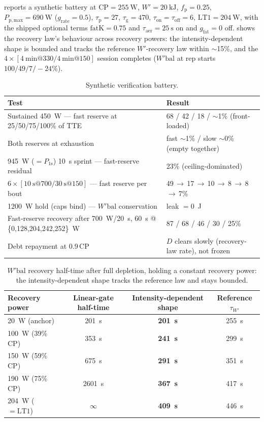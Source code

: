 \documentclass[11pt,a4paper]{article}
\newcommand{\Wp}{\ensuremath{W'}}
\newcommand{\Wbal}{\ensuremath{W'\!\text{bal}}}
\newcommand{\CP}{\ensuremath{\mathrm{CP}}}
\newcommand{\LTone}{\ensuremath{\mathrm{LT1}}}
\newcommand{\fp}{\ensuremath{f_{\mathrm p}}}
\newcommand{\Ppmax}{\ensuremath{P_{\mathrm{p,max}}}}
\newcommand{\grate}{\ensuremath{g_{\mathrm{rate}}}}
\newcommand{\taup}{\ensuremath{\tau_{\mathrm p}}}
\newcommand{\taug}{\ensuremath{\tau_{\mathrm g}}}
\newcommand{\tauon}{\ensuremath{\tau_{\mathrm{on}}}}
\newcommand{\tauoff}{\ensuremath{\tau_{\mathrm{off}}}}
\newcommand{\tauW}{\ensuremath{\tau_{W'}}}
\newcommand{\tauaer}{\ensuremath{\tau_{\mathrm{aer}}}}
\newcommand{\Pos}{\ensuremath{P_{1\mathrm s}}}
\begin{document}
 reports a synthetic battery at $\CP = 255~\mathrm{W}$, $\Wp = 20~\mathrm{kJ}$,
$\fp = 0.25$, $\Ppmax = 690~\mathrm{W}$ ($\grate = 0.5$), $\taup = 27$, $\taug = 470$,
$\tauon = \tauoff = 6$, $\LTone = 204~\mathrm{W}$, with the shipped optional terms $\mathrm{fatK} = 0.75$
and $\tauaer = 25~\mathrm{s}$ on and $g_{\mathrm{fat}} = 0$ off.  shows the recovery law's behaviour
across recovery powers: the intensity-dependent shape is bounded and tracks the reference \Wp-recovery law
within $\sim$15\%, and the $4\times[\SI{4}{\minute}@330 / \SI{4}{\minute}@150]$ session completes
(\Wbal{} at rep starts $100/49/7/-24$\%).

\begin{table}[htbp]\centering\small
\caption{Synthetic verification battery.}
\label{tab:battery}
\renewcommand{\arraystretch}{1.2}
\begin{tabularx}{\linewidth}{@{}Xl@{}}
\toprule
\textbf{Test} & \textbf{Result} \\
\midrule
Sustained 450~W --- fast reserve at 25/50/75/100\% of TTE & 68 / 42 / 18 / $\sim$1\% (front-loaded) \\
Both reserves at exhaustion & fast $\sim$1\% / slow $\sim$0\% (empty together) \\
945~W ($=\Pos$) 10~s sprint --- fast-reserve residual & 23\% (ceiling-dominated) \\
$6\times[\SI{10}{\second}@700 / \SI{30}{\second}@150]$ --- fast reserve per bout & 49\,$\to$\,17\,$\to$\,10\,$\to$\,8\,$\to$\,8\,$\to$\,7\% \\
1200~W hold (caps bind) --- \Wbal{} conservation & leak $= 0$~J \\
Fast-reserve recovery after 700~W/20~s, 60~s @ \{0,128,204,242,252\}~W & 87 / 68 / 46 / 30 / 25\% \\
Debt repayment at 0.9\,\CP & $D$ clears slowly (recovery-law rate), not frozen \\
\bottomrule
\end{tabularx}
\end{table}

\begin{table}[htbp]\centering\small
\caption{\Wbal{} recovery half-time after full depletion, holding a constant recovery power: the
intensity-dependent shape tracks the reference law and stays bounded.}
\label{tab:recovery}
\renewcommand{\arraystretch}{1.2}
\begin{tabular}{@{}lccc@{}}
\toprule
\textbf{Recovery power} & \textbf{Linear-gate half-time} & \textbf{Intensity-dependent shape} & \textbf{Reference \tauW} \\
\midrule
20~W (anchor)      & 201~s & \textbf{201~s} & 255~s \\
100~W (39\%\,\CP)  & 353~s & \textbf{241~s} & 299~s \\
150~W (59\%\,\CP)  & 675~s & \textbf{291~s} & 351~s \\
190~W (75\%\,\CP)  & 2601~s & \textbf{367~s} & 417~s \\
204~W ($=\LTone$)  & $\infty$ & \textbf{409~s} & 446~s \\
\bottomrule
\end{tabular}
\end{table}
\end{document}
